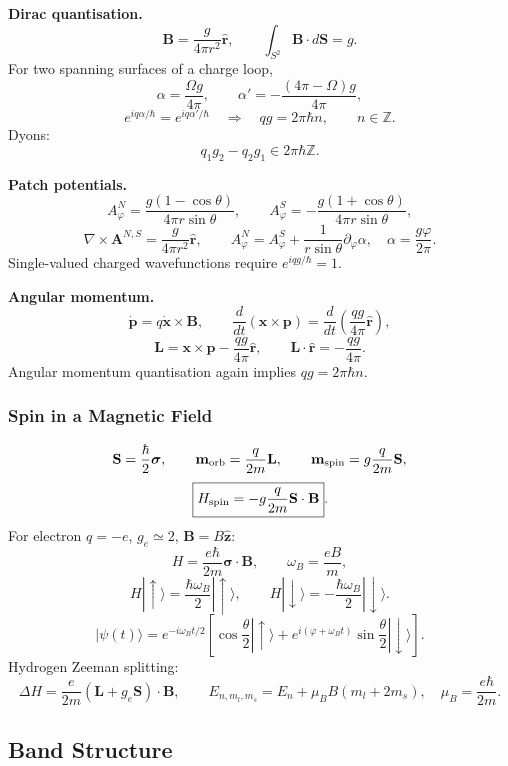 \noindent\textbf{Dirac quantisation.}
\[
\mathbf B=\frac{g}{4\pi r^2}\hat{\mathbf r},\qquad
\int_{S^2}\mathbf B\cdot d\mathbf S=g.
\]
For two spanning surfaces of a charge loop,
\[
\alpha=\frac{\Omega g}{4\pi},\qquad
\alpha'=-\frac{(4\pi-\Omega)g}{4\pi},
\]
\[
e^{iq\alpha/\hbar}=e^{iq\alpha'/\hbar}
\quad\Longrightarrow\quad
\boxed{qg=2\pi\hbar n,\qquad n\in\mathbb Z}.
\]
Dyons:
\[
\boxed{q_1g_2-q_2g_1\in2\pi\hbar\mathbb Z}.
\]

\noindent\textbf{Patch potentials.}
\[
A_\varphi^N=\frac{g(1-\cos\theta)}{4\pi r\sin\theta},\qquad
A_\varphi^S=-\frac{g(1+\cos\theta)}{4\pi r\sin\theta},
\]
\[
\nabla\times\mathbf A^{N,S}=\frac{g}{4\pi r^2}\hat{\mathbf r},\qquad
A_\varphi^N=A_\varphi^S+\frac{1}{r\sin\theta}\partial_\varphi\alpha,\quad
\alpha=\frac{g\varphi}{2\pi}.
\]
Single-valued charged wavefunctions require $e^{iqg/\hbar}=1$.

\noindent\textbf{Angular momentum.}
\[
\dot{\mathbf p}=q\dot{\mathbf x}\times\mathbf B,\qquad
\frac{d}{dt}(\mathbf x\times\mathbf p)
=\frac{d}{dt}\left(\frac{qg}{4\pi}\hat{\mathbf r}\right),
\]
\[
\boxed{\mathbf L=\mathbf x\times\mathbf p-\frac{qg}{4\pi}\hat{\mathbf r}},
\qquad
\mathbf L\cdot\hat{\mathbf r}=-\frac{qg}{4\pi}.
\]
Angular momentum quantisation again implies $qg=2\pi\hbar n$.

\subsubsection*{Spin in a Magnetic Field}

\[
\mathbf S=\frac{\hbar}{2}\bm\sigma,\qquad
\mathbf m_{\rm orb}=\frac{q}{2m}\mathbf L,\qquad
\mathbf m_{\rm spin}=g\frac{q}{2m}\mathbf S,
\]
\[
\boxed{H_{\rm spin}=-g\frac{q}{2m}\mathbf S\cdot\mathbf B}.
\]
For electron $q=-e$, $g_e\simeq2$, $\mathbf B=B\hat{\mathbf z}$:
\[
H=\frac{e\hbar}{2m}\bm\sigma\cdot\mathbf B,\qquad
\omega_B=\frac{eB}{m},
\]
\[
H|\uparrow\rangle=\frac{\hbar\omega_B}{2}|\uparrow\rangle,\qquad
H|\downarrow\rangle=-\frac{\hbar\omega_B}{2}|\downarrow\rangle.
\]
\[
|\psi(t)\rangle=e^{-i\omega_Bt/2}\left[
\cos\frac{\theta}{2}|\uparrow\rangle+
e^{i(\varphi+\omega_Bt)}\sin\frac{\theta}{2}|\downarrow\rangle\right].
\]
Hydrogen Zeeman splitting:
\[
\Delta H=\frac{e}{2m}(\mathbf L+g_e\mathbf S)\cdot\mathbf B,\qquad
\boxed{E_{n,m_l,m_s}=E_n+\mu_BB(m_l+2m_s)},\quad
\mu_B=\frac{e\hbar}{2m}.
\]

\subsection{Band Structure}


